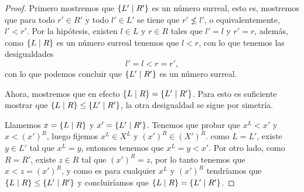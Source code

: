     \begin{proof}
        Primero mostremos que $\left\{L'\mid R'\right\}$ es un n\'umero surreal, esto es, mostremos que para todo $r'\in R'$ y todo $l'\in L'$ se tiene que $r' \not\le l'$, o equivalentemente, $l' < r'$. Por la hip\'otesis, existen $l\in L$ y $r\in R$ tales que $l' = l$ y $r' = r$, adem\'as, como $\left\{L\mid R\right\}$ es un n\'umero surreal tenemos que $l < r$, con lo que tenemos las desigualdades
        \[
            l' = l < r = r',
        \]
        con lo que podemos concluir que $\left\{L'\mid R'\right\}$ es un n\'umero surreal.

        Ahora, mostremos que en efecto $\left\{L\mid R\right\} = \left\{L'\mid R'\right\}$. Para esto es suficiente mostrar que $\left\{L\mid R\right\} \le \left\{L'\mid R'\right\}$, la otra desigualdad se sigue por simetr\'ia.

        Llamemos $x = \left\{L\mid R\right\}$ y $x' = \left\{L'\mid R'\right\}$. Tenemos que probar que $x^L < x'$ y $x < (x')^R$, luego fijemos $x^L\in X^L$ y $(x')^R\in (X')^R$. como $L = L'$, existe $y\in L'$ tal que $x^L = y$, entonces tenemos que $x^L = y < x'$. Por otro lado, como $R = R'$, existe $z\in R$ tal que $(x')^R = z$, por lo tanto tenemos que $x < z = (x')^R$, y como es para cualquier $x^L$ y $(x')^R$ tendr\'iamos que $\left\{L\mid R\right\} \le \left\{L'\mid R'\right\}$ y concluir\'iamos que $\left\{L\mid R\right\} = \left\{L'\mid R'\right\}$.
    \end{proof}